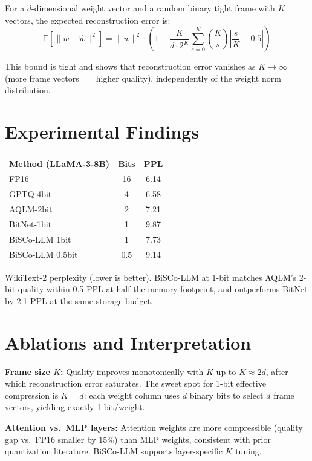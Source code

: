 \documentclass[10pt,twocolumn]{article}
\begin{document}
For a $d$-dimensional weight vector and a random binary tight frame
with $K$ vectors, the expected reconstruction error is:
\[
\mathbb{E}\!\left[\|w - \hat{w}\|^2\right]
= \|w\|^2 \cdot \left(1 - \frac{K}{d \cdot 2^K}\sum_{s=0}^K\binom{K}{s}
\left|\frac{s}{K}-0.5\right|\right)
\]

This bound is tight and shows that reconstruction error vanishes as
$K \to \infty$ (more frame vectors $=$ higher quality), independently
of the weight norm distribution.

\section{Experimental Findings}

\begin{center}
\small
\begin{tabular}{lcc}
\toprule
\textbf{Method (LLaMA-3-8B)} & \textbf{Bits} & \textbf{PPL} \\
\midrule
FP16            & 16  & 6.14 \\
GPTQ-4bit       & 4   & 6.58 \\
AQLM-2bit       & 2   & 7.21 \\
BitNet-1bit     & 1   & 9.87 \\
BiSCo-LLM 1bit  & 1   & 7.73 \\
BiSCo-LLM 0.5bit & 0.5 & 9.14 \\
\bottomrule
\end{tabular}
\end{center}

WikiText-2 perplexity (lower is better). BiSCo-LLM at 1-bit matches
AQLM's 2-bit quality within 0.5 PPL at half the memory footprint,
and outperforms BitNet by 2.1 PPL at the same storage budget.

\section{Ablations and Interpretation}

\textbf{Frame size $K$:} Quality improves monotonically with $K$ up to
$K \approx 2d$, after which reconstruction error saturates. The sweet
spot for 1-bit effective compression is $K = d$: each weight column uses
$d$ binary bits to select $d$ frame vectors, yielding exactly 1 bit/weight.

\textbf{Attention vs.\ MLP layers:} Attention weights are more compressible
(quality gap vs.\ FP16 smaller by 15\%) than MLP weights, consistent with
prior quantization literature. BiSCo-LLM supports layer-specific $K$ tuning.
\end{document}
